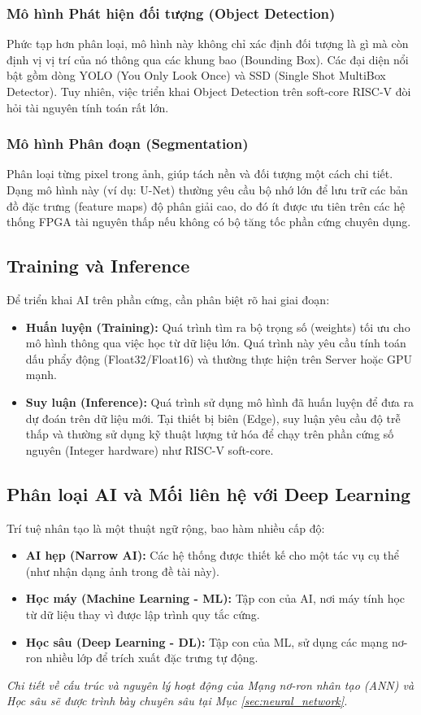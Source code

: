 \subsubsection{Mô hình Phát hiện đối tượng (Object Detection)}
Phức tạp hơn phân loại, mô hình này không chỉ xác định đối tượng là gì mà còn định vị vị trí của nó thông qua các khung bao (Bounding Box). Các đại diện nổi bật gồm dòng YOLO (You Only Look Once) và SSD (Single Shot MultiBox Detector). Tuy nhiên, việc triển khai Object Detection trên soft-core RISC-V đòi hỏi tài nguyên tính toán rất lớn.

\subsubsection{Mô hình Phân đoạn (Segmentation)}
Phân loại từng pixel trong ảnh, giúp tách nền và đối tượng một cách chi tiết. Dạng mô hình này (ví dụ: U-Net) thường yêu cầu bộ nhớ lớn để lưu trữ các bản đồ đặc trưng (feature maps) độ phân giải cao, do đó ít được ưu tiên trên các hệ thống FPGA tài nguyên thấp nếu không có bộ tăng tốc phần cứng chuyên dụng.

\subsection{Training và Inference}
Để triển khai AI trên phần cứng, cần phân biệt rõ hai giai đoạn:
\begin{itemize}
    \item \textbf{Huấn luyện (Training):} Quá trình tìm ra bộ trọng số (weights) tối ưu cho mô hình thông qua việc học từ dữ liệu lớn. Quá trình này yêu cầu tính toán dấu phẩy động (Float32/Float16) và thường thực hiện trên Server hoặc GPU mạnh.
    \item \textbf{Suy luận (Inference):} Quá trình sử dụng mô hình đã huấn luyện để đưa ra dự đoán trên dữ liệu mới. Tại thiết bị biên (Edge), suy luận yêu cầu độ trễ thấp và thường sử dụng kỹ thuật lượng tử hóa để chạy trên phần cứng số nguyên (Integer hardware) như RISC-V soft-core.
\end{itemize}

\subsection{Phân loại AI và Mối liên hệ với Deep Learning}
Trí tuệ nhân tạo là một thuật ngữ rộng, bao hàm nhiều cấp độ:
\begin{itemize}
    \item \textbf{AI hẹp (Narrow AI):} Các hệ thống được thiết kế cho một tác vụ cụ thể (như nhận dạng ảnh trong đề tài này).
    \item \textbf{Học máy (Machine Learning - ML):} Tập con của AI, nơi máy tính học từ dữ liệu thay vì được lập trình quy tắc cứng.
    \item \textbf{Học sâu (Deep Learning - DL):} Tập con của ML, sử dụng các mạng nơ-ron nhiều lớp để trích xuất đặc trưng tự động.
\end{itemize}
\textit{Chi tiết về cấu trúc và nguyên lý hoạt động của Mạng nơ-ron nhân tạo (ANN) và Học sâu sẽ được trình bày chuyên sâu tại Mục \ref{sec:neural_network}.}

